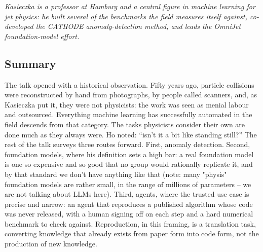 \documentclass[11pt]{article}
\begin{document}
\emph{Kasieczka is a professor at Hamburg and a central figure in machine learning for jet physics: he built several of the benchmarks the field measures itself against, co-developed the CATHODE anomaly-detection method, and leads the OmniJet foundation-model effort.}

\subsection*{Summary}
The talk opened with a historical observation. Fifty years ago, particle collisions were reconstructed by hand from photographs, by people called scanners, and, as Kasieczka put it, they were not physicists: the work was seen as menial labour and outsourced. Everything machine learning has successfully automated in the field descends from that category. The tasks physicists consider their own are done much as they always were. Ho noted: ``isn't it a bit like standing still?'' The rest of the talk surveys three routes forward. First, anomaly detection. Second, foundation models, where his definition sets a high bar: a real foundation model is one so expensive and so good that no group would rationally replicate it, and by that standard we don't have anything like that (note: many "physis" foundation models are rather small, in the range of millions of parameters -- we are not talking about LLMs here). Third, agents, where the trusted use case is precise and narrow: an agent that reproduces a published algorithm whose code was never released, with a human signing off on each step and a hard numerical benchmark to check against. Reproduction, in this framing, is a translation task, converting knowledge that already exists from paper form into code form, not the production of new knowledge.
\end{document}
